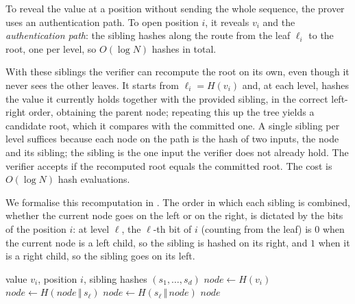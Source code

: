 To reveal the value at a position without sending the whole sequence,
the prover uses an authentication path. To open position $i$, it reveals
$v_i$ and the \emph{authentication path}: the sibling hashes along the
route from the leaf $\ell_i$ to the root, one per level, so $O(\log N)$ 
hashes in total.
 
With these siblings the verifier can recompute the root on its own, even
though it never sees the other leaves. It starts from $\ell_i = H(v_i)$
and, at each level, hashes the value it currently holds together with the
provided sibling, in the correct left-right order, obtaining the parent
node; repeating this up the tree yields a candidate root, which it
compares with the committed one. A single sibling per level suffices
because each node on the path is the hash of two inputs, the node and its
sibling; the sibling is the one input the verifier does not already hold.
The verifier accepts if the recomputed root equals the committed root.
The cost is $O(\log N)$ hash evaluations.
 
We formalise this recomputation in . The order in
which each sibling is combined, whether the current node goes on the left
or on the right, is dictated by the bits of the position $i$: at level
$\ell$, the $\ell$-th bit of $i$ (counting from the leaf) is $0$ when the
current node is a left child, so the sibling is hashed on its right, and
$1$ when it is a right child, so the sibling goes on its left.
 
\begin{algorithm}
\caption{$\mathsf{RootFromPath}$: recompute the root from an opening.}
\label{alg:rootfrompath}
\begin{algorithmic}[1]
\Require value $v_i$, position $i$, sibling hashes $(s_1, \ldots, s_d)$
\State $\mathit{node} \gets H(v_i)$ 
    \State $\mathit{node} \gets H(\mathit{node} \,\Vert\, s_\ell)$
  \Else
    \State $\mathit{node} \gets H(s_\ell \,\Vert\, \mathit{node})$
  \EndIf
\EndFor
\State \Return $\mathit{node}$ 
\end{algorithmic}
\end{algorithm}
 
